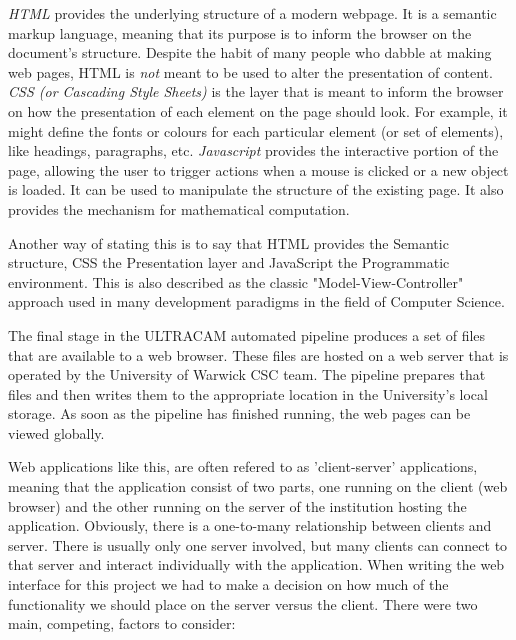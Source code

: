 \emph{HTML} provides the underlying structure of a modern webpage. It is a semantic markup language, meaning that its purpose is to inform the browser on the document's structure. Despite the habit of many people who dabble at making web pages, HTML is \emph{not} meant to be used to alter the presentation of content. \emph{CSS (or Cascading Style Sheets)} is the layer that is meant to inform the browser on how the presentation of each element on the page should look. For example, it might define the fonts or colours for each particular element (or set of elements), like headings, paragraphs, etc. \emph{Javascript} provides the interactive portion of the page, allowing the user to trigger actions when a mouse is clicked or a new object is loaded. It can be used to manipulate the structure of the existing page. It also provides the mechanism for mathematical computation.

Another way of stating this is to say that HTML provides the Semantic structure, CSS the Presentation layer and JavaScript the Programmatic environment. This is also described as the classic "Model-View-Controller" approach used in many development paradigms in the field of Computer Science.

The final stage in the ULTRACAM automated pipeline produces a set of files that are available to a web browser. These files are hosted on a web server that is operated by the University of Warwick CSC team. The pipeline prepares that files and then writes them to the appropriate location in the University's local storage. As soon as the pipeline has finished running, the web pages can be viewed globally. 

\label{sect:clientserver}
Web applications like this, are often refered to as 'client-server' applications, meaning that the application consist of two parts, one running on the client (web browser) and the other running on the server of the institution hosting the application. Obviously, there is a one-to-many relationship between clients and server. There is usually only one server involved, but many clients can connect to that server and interact individually with the application. When writing the web interface for this project we had to make a decision on how much of the functionality we should place on the server versus the client. There were two main, competing, factors to consider:

